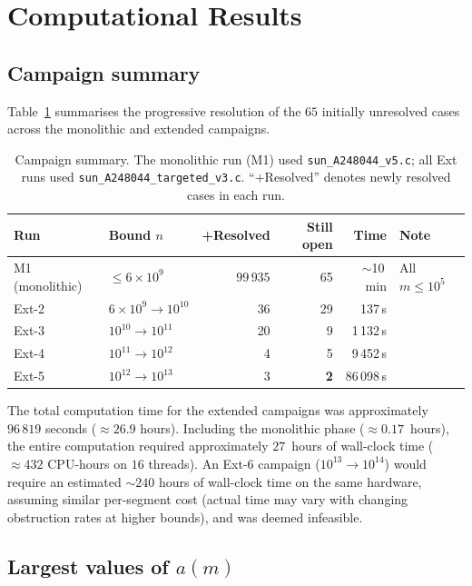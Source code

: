 \documentclass[11pt]{article}
\theoremstyle{definition}
\theoremstyle{remark}
\numberwithin{equation}{section}
\begin{document}
\section{Computational Results}
\label{sec:results}

\subsection{Campaign summary}

Table~\ref{tab:campaigns} summarises the progressive resolution of
the $65$ initially unresolved cases across the monolithic and
extended campaigns.

\begin{table}[ht]
\centering
\caption[Campaign summary]{Campaign summary.  The monolithic run (M1) used
\texttt{sun\_A248044\_v5.c}; all Ext runs used
\texttt{sun\_A248044\_targeted\_v3.c}.
``+Resolved'' denotes newly resolved cases in each run.}
\label{tab:campaigns}
\small
\begin{tabular}{llrrrl}
\toprule
Run & Bound $n$ & +Resolved & Still open & Time & Note \\
\midrule
M1 (monolithic) & $\le 6 \times 10^9$
  & $99\,935$ & 65 & $\sim$10\,min & All $m \le 10^5$ \\
Ext-2 & $6 \times 10^9 \to 10^{10}$
  & 36 & 29 & 137\,s & \\
Ext-3 & $10^{10} \to 10^{11}$
  & 20 & 9 & 1\,132\,s & \\
Ext-4 & $10^{11} \to 10^{12}$
  & 4 & 5 & 9\,452\,s & \\
Ext-5 & $10^{12} \to 10^{13}$
  & 3 & \textbf{2} & 86\,098\,s & \\
\bottomrule
\end{tabular}
\end{table}

The total computation time for the extended campaigns was
approximately $96\,819$ seconds ($\approx 26.9$ hours).
Including the monolithic phase ($\approx 0.17$~hours), the entire
computation required approximately $27$~hours of wall-clock time
($\approx 432$ CPU-hours on $16$ threads).
An Ext-6 campaign ($10^{13} \to 10^{14}$) would require an
estimated $\sim 240$ hours of wall-clock time on the same hardware,
assuming similar per-segment cost (actual time may vary with
changing obstruction rates at higher bounds),
and was deemed infeasible.

\subsection{Largest values of \texorpdfstring{$a(m)$}{a(m)}}
\end{document}
